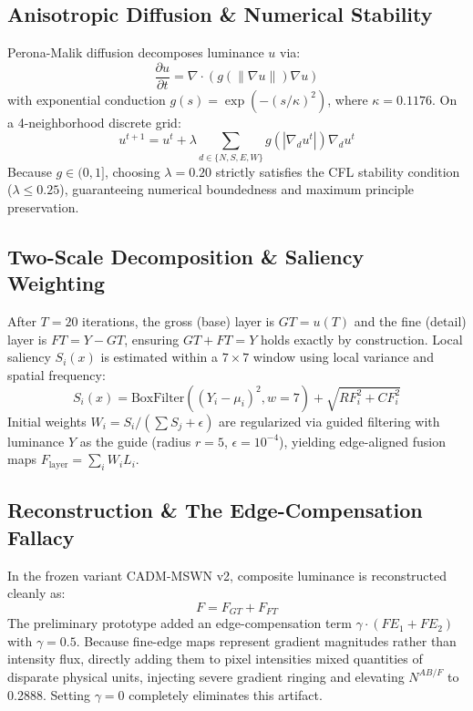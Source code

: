 \documentclass[conference]{IEEEtran}
\begin{document}
\subsection{Anisotropic Diffusion \& Numerical Stability}
Perona-Malik diffusion decomposes luminance $u$ via:
\begin{equation}
\frac{\partial u}{\partial t} = \nabla \cdot ( g(\|\nabla u\|) \nabla u )
\end{equation}
with exponential conduction $g(s) = \exp(-(s/\kappa)^2)$, where $\kappa = 0.1176$. On a 4-neighborhood discrete grid:
\begin{equation}
u^{t+1} = u^t + \lambda \sum_{d \in \{N,S,E,W\}} g(|\nabla_d u^t|) \nabla_d u^t
\end{equation}
Because $g \in (0, 1]$, choosing $\lambda = 0.20$ strictly satisfies the CFL stability condition ($\lambda \le 0.25$), guaranteeing numerical boundedness and maximum principle preservation.

\subsection{Two-Scale Decomposition \& Saliency Weighting}
After $T=20$ iterations, the gross (base) layer is $GT = u(T)$ and the fine (detail) layer is $FT = Y - GT$, ensuring $GT + FT = Y$ holds exactly by construction. Local saliency $S_i(x)$ is estimated within a $7 \times 7$ window using local variance and spatial frequency:
\begin{equation}
S_i(x) = \text{BoxFilter}((Y_i - \mu_i)^2, w=7) + \sqrt{RF_i^2 + CF_i^2}
\end{equation}
Initial weights $W_i = S_i / (\sum S_j + \epsilon)$ are regularized via guided filtering with luminance $Y$ as the guide (radius $r=5$, $\epsilon=10^{-4}$), yielding edge-aligned fusion maps $F_{\text{layer}} = \sum_i W_i L_i$.

\subsection{Reconstruction \& The Edge-Compensation Fallacy}
In the frozen variant CADM-MSWN v2, composite luminance is reconstructed cleanly as:
\begin{equation}
F = F_{GT} + F_{FT}
\end{equation}
The preliminary prototype added an edge-compensation term $\gamma \cdot (FE_1 + FE_2)$ with $\gamma=0.5$. Because fine-edge maps represent gradient magnitudes rather than intensity flux, directly adding them to pixel intensities mixed quantities of disparate physical units, injecting severe gradient ringing and elevating $N^{AB/F}$ to 0.2888. Setting $\gamma=0$ completely eliminates this artifact.
\end{document}
